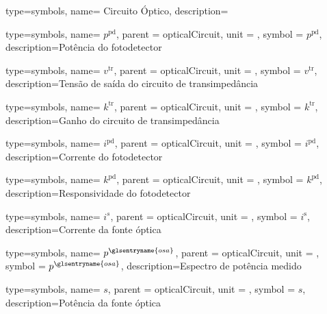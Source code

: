 {type=symbols,
    name= {Circuito Óptico},
    description={}
}


{type=symbols,
    name= \ensuremath{p^\text{pd}},
    parent = {opticalCircuit},
    unit = \unexpanded{\si{\watt}},
    symbol = \ensuremath{p^\text{pd}},
    description={Potência do fotodetector}
}


{type=symbols,
    name= \ensuremath{v^\text{tr}},
    parent = {opticalCircuit},
    unit = \unexpanded{\si{\volt}},
    symbol = \ensuremath{v^\text{tr}},
    description={Tensão de saída do circuito de transimpedância}
}


{type=symbols,
    name= \ensuremath{k^\text{tr}},
    parent = {opticalCircuit},
    unit = \unexpanded{\si{\volt\per\ampere}},
    symbol = \ensuremath{k^\text{tr}},
    description={Ganho do circuito de transimpedância}
}

{type=symbols,
    name= \ensuremath{i^\text{pd}},
    parent = {opticalCircuit},
    unit = \unexpanded{\si{\ampere}},
    symbol = \ensuremath{i^\text{pd}},
    description={Corrente do fotodetector}
}

{type=symbols,
    name= \ensuremath{k^\text{pd}},
    parent = {opticalCircuit},
    unit = \unexpanded{\si{\ampere\per\watt}},
    symbol = \ensuremath{k^\text{pd}},
    description={Responsividade do fotodetector}
}



{type=symbols,
    name= \ensuremath{i^{s}},
    parent = {opticalCircuit},
    unit = \unexpanded{\si{\ampere}},
    symbol = \ensuremath{i^\text{s}},
    description={Corrente da fonte óptica}
}

{type=symbols,
    name= \ensuremath{p^{\glsentryname{osa}}},
    parent = {opticalCircuit},
    unit = \unexpanded{\si{\watt\per\lambda}},
    symbol = \ensuremath{p^{\glsentryname{osa}}},
    description={Espectro de potência medido}
}



{type=symbols,
    name= \ensuremath{s},
    parent = {opticalCircuit},
    unit = \unexpanded{\si{\watt}},
    symbol = \ensuremath{s},
    description={Potência da fonte óptica}
}